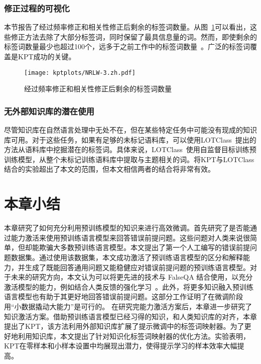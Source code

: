\subsubsection{修正过程的可视化}
\label{app:remainwords}
本节报告了经过频率修正和相关性修正后剩余的标签词数量。从图~\ref{fig:remainwords}可以看出，这些修正方法去除了大部分标签词，同时保留了最具信息量的词。然而，即使剩余的标签词数量最少也超过100个，远多于之前工作中的标签词数量~\cite{schick2020automatically}。广泛的标签词覆盖是KPT成功的关键。

\begin{figure}[!htbp]
    \centering
    \texttt{[image: kptplots/NRLW-3.zh.pdf]}
    \caption{经过频率修正和相关性修正后剩余的标签词数量}
    \label{fig:remainwords}
\end{figure}

\subsubsection{无外部知识库的潜在使用}
\label{withoutkb}
尽管知识库在自然语言处理中无处不在，但在某些特定任务中可能没有现成的知识库可用。对于这些任务，如果有足够的未标记语料库，可以使用LOTClass~\cite{meng2020text}提出的方法从语料库中挖掘潜在的标签词。具体来说，LOTClass~\cite{meng2020text}使用自监督目标训练预训练模型，从整个未标记训练语料库中提取与主题相关的词。将KPT与LOTClass结合的实验超出了本文的范围，但本文相信两者的结合将非常有效。

\section{本章小结}


本章研究了如何充分利用预训练模型的知识来进行高效微调。首先研究了是否能通过能力激活来使用预训练语言模型来回答错误前提问题。这些问题对人类来说很简单，但却能欺骗大多数预训练语言模型。本文提出了第一个人工编写的错误前提问题数据集。通过使用该数据集，本文成功激活了预训练语言模型的区分和解释能力，并生成了既能回答通用问题又能稳健应对错误前提问题的预训练语言模型。对于未来的研究方向，本文认为可以将更先进的技术与 FalseQA 结合使用，以充分激活模型的能力，例如结合人类反馈的强化学习~\cite{ouyang2022training}。此外，将更多知识融入预训练语言模型也有助于其更好地回答错误前提问题。这部分工作证明了在微调阶段用“小数据撬动大能力”是可行的。
在研究完能力激活方案后，本章进一步研究了知识激活方案。借助预训练语言模型已经习得的知识，和人类知识库的对齐，本章提出了KPT，该方法利用外部知识库扩展了提示微调中的标签词映射器。为了更好地利用知识库，本文提出了针对知识化标签词映射器的优化方法。实验表明，KPT在零样本和小样本设置中均展现出潜力，使得提示学习的样本效率大幅提高。

